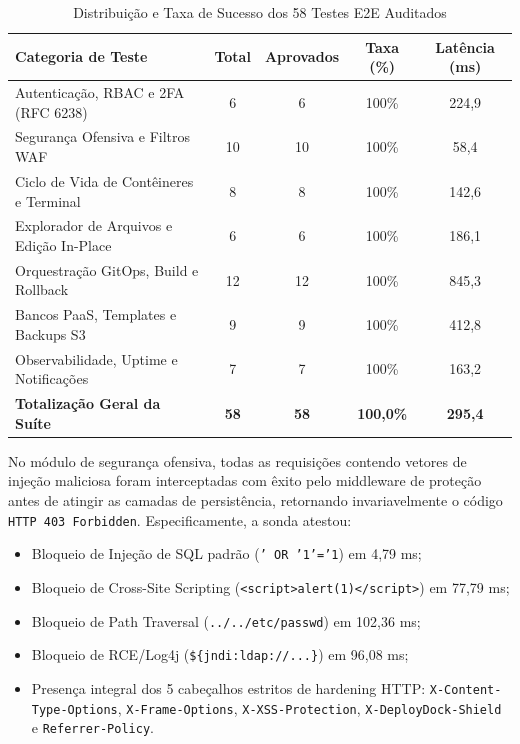 \begin{table}[htb]
    \centering
    \ABNTEXfontereduzida
    \begin{minipage}{\textwidth}
        \caption{Distribuição e Taxa de Sucesso dos 58 Testes E2E Auditados}
        \label{tab:resultados-e2e}
        \setlength{\tabcolsep}{5pt}
        \begin{tabular}{p{6.8cm}cccc}
            \toprule
            \textbf{Categoria de Teste} & \textbf{Total} & \textbf{Aprovados} & \textbf{Taxa (\%)} & \textbf{Latência (ms)} \\
            \midrule
            Autenticação, RBAC e 2FA (RFC 6238) & 6 & 6 & 100\% & 224,9 \\
            Segurança Ofensiva e Filtros WAF & 10 & 10 & 100\% & 58,4 \\
            Ciclo de Vida de Contêineres e Terminal & 8 & 8 & 100\% & 142,6 \\
            Explorador de Arquivos e Edição In-Place & 6 & 6 & 100\% & 186,1 \\
            Orquestração GitOps, Build e Rollback & 12 & 12 & 100\% & 845,3 \\
            Bancos PaaS, Templates e Backups S3 & 9 & 9 & 100\% & 412,8 \\
            Observabilidade, Uptime e Notificações & 7 & 7 & 100\% & 163,2 \\
            \midrule
            \textbf{Totalização Geral da Suíte} & \textbf{58} & \textbf{58} & \textbf{100,0\%} & \textbf{295,4} \\
            \bottomrule
        \end{tabular}
    \end{minipage}
\end{table}

No módulo de segurança ofensiva, todas as requisições contendo vetores de injeção maliciosa foram interceptadas com êxito pelo middleware de proteção antes de atingir as camadas de persistência, retornando invariavelmente o código \texttt{HTTP 403 Forbidden}. Especificamente, a sonda atestou:
\begin{itemize}
    \item Bloqueio de Injeção de SQL padrão (\texttt{' OR '1'='1}) em 4,79 ms;
    \item Bloqueio de Cross-Site Scripting (\texttt{<script>alert(1)</script>}) em 77,79 ms;
    \item Bloqueio de Path Traversal (\texttt{../../etc/passwd}) em 102,36 ms;
    \item Bloqueio de RCE/Log4j (\texttt{\$\{jndi:ldap://...\}}) em 96,08 ms;
    \item Presença integral dos 5 cabeçalhos estritos de hardening HTTP: \texttt{X-Content-Type-Options}, \texttt{X-Frame-Options}, \texttt{X-XSS-Protection}, \texttt{X-DeployDock-Shield} e \texttt{Referrer-Policy}.
\end{itemize}

